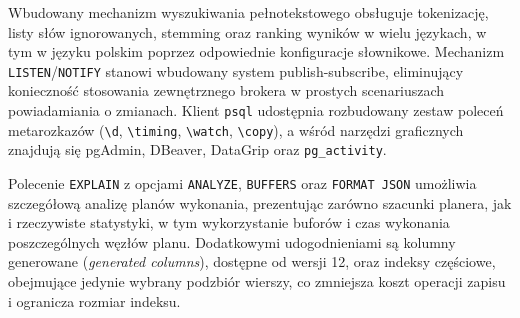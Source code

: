 Wbudowany mechanizm wyszukiwania pełnotekstowego obsługuje tokenizację,
listy słów ignorowanych, stemming oraz ranking wyników w wielu językach,
w tym w języku polskim poprzez odpowiednie konfiguracje słownikowe.
Mechanizm \texttt{LISTEN}/\texttt{NOTIFY} stanowi wbudowany system
publish-subscribe, eliminujący konieczność stosowania zewnętrznego brokera
w prostych scenariuszach powiadamiania o zmianach. Klient \texttt{psql}
udostępnia rozbudowany zestaw poleceń metarozkazów (\verb|\d|, \verb|\timing|,
\verb|\watch|, \verb|\copy|), a wśród narzędzi graficznych znajdują się
pgAdmin, DBeaver, DataGrip oraz \texttt{pg\_activity}.

Polecenie \texttt{EXPLAIN} z opcjami \texttt{ANALYZE}, \texttt{BUFFERS} oraz
\texttt{FORMAT JSON} umożliwia szczegółową analizę planów wykonania,
prezentując zarówno szacunki planera, jak i rzeczywiste statystyki, w tym
wykorzystanie buforów i czas wykonania poszczególnych węzłów planu.
Dodatkowymi udogodnieniami są kolumny generowane (\textit{generated columns}),
dostępne od wersji 12, oraz indeksy częściowe, obejmujące jedynie wybrany
podzbiór wierszy, co zmniejsza koszt operacji zapisu i ogranicza rozmiar
indeksu.
